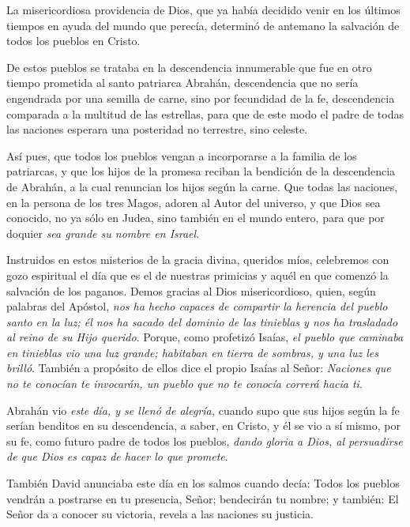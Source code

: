 			
			
			\begin{body}
				La misericordiosa providencia de Dios, que ya había decidido venir en los últimos tiempos en ayuda del mundo que perecía, determinó de antemano la salvación de todos los pueblos en Cristo.
				
				De estos pueblos se trataba en la descendencia innumerable que fue en otro tiempo prometida al santo patriarca Abrahán, descendencia que no sería engendrada por una semilla de carne, sino por fecundidad de la fe, descendencia comparada a la multitud de las estrellas, para que de este modo el padre de todas las naciones esperara una posteridad no terrestre, sino celeste.
				
				Así pues, que todos los pueblos vengan a incorporarse a la familia de los patriarcas, y que los hijos de la promesa reciban la bendición de la descendencia de Abrahán, a la cual renuncian los hijos según la carne. Que todas las naciones, en la persona de los tres Magos, adoren al Autor del universo, y que Dios sea conocido, no ya sólo en Judea, sino también en el mundo entero, para que por doquier \emph{sea grande su nombre en Israel}.
				
				Instruidos en estos misterios de la gracia divina, queridos míos, celebremos con gozo espiritual el día que es el de nuestras primicias y aquél en que comenzó la salvación de los paganos. Demos gracias al Dios misericordioso, quien, según palabras del Apóstol, \emph{nos ha hecho capaces de compartir la herencia del pueblo santo en la luz; él nos ha sacado del dominio de las tinieblas y nos ha trasladado al reino de su Hijo querido}. Porque, como profetizó Isaías, \emph{el pueblo que caminaba en tinieblas vio una luz grande; habitaban en tierra de sombras, y una luz les brilló}. También a propósito de ellos dice el propio Isaías al Señor: \emph{Naciones que no te conocían te invocarán, un pueblo que no te conocía correrá hacia ti}.
				
				Abrahán vio \emph{este día, y se llenó de alegría,} cuando supo que sus hijos según la fe serían benditos en su descendencia, a saber, en Cristo, y él se vio a sí mismo, por su fe, como futuro padre de todos los pueblos, \emph{dando gloria a Dios, al persuadirse de que Dios es capaz de hacer lo que promete}.
				
				También David anunciaba este día en los salmos cuando decía: Todos los pueblos vendrán a postrarse en tu presencia, Señor; bendecirán tu nombre; y también: El Señor da a conocer su victoria, revela a las naciones su justicia.
				

\end{body}
